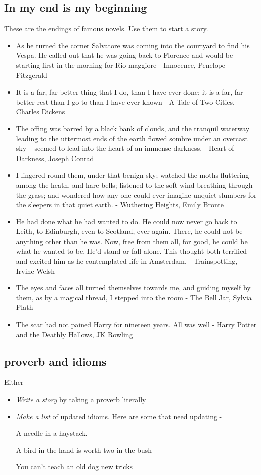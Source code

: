 \documentclass[11pt]{article}
\begin{document}
\subsection*{In my end is my beginning}
These are the endings of famous novels. Use them to start a story.
\begin{itemize}
\item As he turned the corner Salvatore was coming into the courtyard to find his Vespa. He called out that he was going back to Florence and would be starting first in the morning for Rio-maggiore - Innocence, Penelope Fitzgerald

\item It is a far, far better thing that I do, than I have ever done; it is a far, far better rest than I go to than I have ever known - A Tale of Two Cities, Charles Dickens

\item The offing was barred by a black bank of clouds, and the tranquil waterway leading to the uttermost ends of the earth flowed sombre under an overcast sky – seemed to lead into the heart of an immense darkness. - Heart of Darkness, Joseph Conrad

\item I lingered round them, under that benign sky; watched the moths fluttering among the heath, and hare-bells; listened to the soft wind breathing through the grass; and wondered how any one could ever imagine unquiet slumbers for the sleepers in that quiet earth. - Wuthering Heights, Emily Bronte

\item He had done what he had wanted to do. He could now never go back to Leith, to Edinburgh, even to Scotland, ever again. There, he could not be anything other than he was. Now, free from them all, for good, he could be what he wanted to be. He’d stand or fall alone. This thought both terrified and excited him as he contemplated life in Amsterdam. - Trainspotting, Irvine Welsh

\item The eyes and faces all turned themselves towards me, and guiding myself by them, as by a magical thread, I stepped into the room - The Bell Jar, Sylvia Plath

\item The scar had not pained Harry for nineteen years. All was well - Harry Potter and the Deathly Hallows, JK Rowling 
\end{itemize}


\subsection*{proverb and idioms}
Either
\begin{itemize}
\item \textit{Write a story} by taking a proverb literally
\item \textit{Make a list} of updated idioms. Here are some that need updating -

A needle in a haystack.

A bird in the hand is worth two in the bush

You can't teach an old dog new  tricks
\end{itemize}
\end{document}
